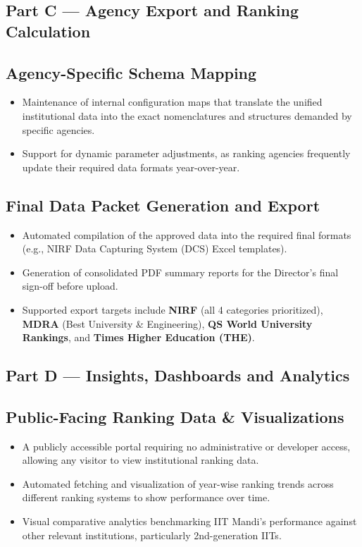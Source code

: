 \documentclass[11pt]{article}
\begin{document}
\subsection*{Part C --- Agency Export and Ranking Calculation}

\subsection{Agency-Specific Schema Mapping}
\begin{itemize}[leftmargin=1.4em, itemsep=3pt]
\item Maintenance of internal configuration maps that translate the unified institutional data into the exact nomenclatures and structures demanded by specific agencies.
\item Support for dynamic parameter adjustments, as ranking agencies frequently update their required data formats year-over-year.
\end{itemize}

\subsection{Final Data Packet Generation and Export}
\begin{itemize}[leftmargin=1.4em, itemsep=3pt]
\item Automated compilation of the approved data into the required final formats (e.g., NIRF Data Capturing System (DCS) Excel templates).
\item Generation of consolidated PDF summary reports for the Director's final sign-off before upload.
\item Supported export targets include \textbf{NIRF} (all 4 categories prioritized), \textbf{MDRA} (Best University \& Engineering), \textbf{QS World University Rankings}, and \textbf{Times Higher Education (THE)}.
\end{itemize}

\subsection*{Part D --- Insights, Dashboards and Analytics}

\subsection{Public-Facing Ranking Data \& Visualizations}
\begin{itemize}[leftmargin=1.4em, itemsep=3pt]
\item A publicly accessible portal requiring no administrative or developer access, allowing any visitor to view institutional ranking data.
\item Automated fetching and visualization of year-wise ranking trends across different ranking systems to show performance over time.
\item Visual comparative analytics benchmarking IIT Mandi's performance against other relevant institutions, particularly 2nd-generation IITs.
\end{itemize}
\end{document}
